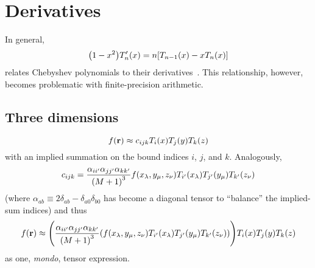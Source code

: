 \section{Derivatives}

In general,
\begin{equation}
  \qty(1 - x^2) T_n'(x) = n \qty[T_{n-1}(x) - x T_n(x)]
  \label{eq:chebyshev derivatives}
\end{equation}
relates Chebyshev polynomials to their derivatives~\cite{Gil2007}. 
This relationship, however, becomes problematic with finite-precision arithmetic.


\subsection{Three dimensions}
\begin{equation}
  f(\vb{r}) \approx c_{ijk}T_i(x) T_j(y) T_k(z)
\end{equation}
with an implied summation on the bound indices $i$, $j$, and $k$.
Analogously,
\begin{equation}
  c_{ijk} = \frac{\alpha_{ii'} \alpha_{jj'} \alpha_{kk'}}{\qty(M+1)^3} f(x_\lambda, y_\mu, z_\nu) T_{i'}(x_\lambda) T_{j'}(y_\mu) T_{k'}(z_\nu)
\end{equation}
(where $\alpha_{ab} \equiv 2\delta_{ab} - \delta_{a0}\delta_{b0}$ has become a diagonal tensor to ``balance'' the implied-sum indices) and thus
\begin{equation}
  f(\vb{r}) \approx \qty(\frac{\alpha_{ii'} \alpha_{jj'} \alpha_{kk'}}{\qty(M+1)^3} \qty(f(x_\lambda, y_\mu, z_\nu) T_{i'}(x_\lambda) T_{j'}(y_\mu) T_{k'}(z_\nu))) T_i(x) T_j(y) T_k(z)
\end{equation}
as one, \emph{mondo}, tensor expression.
